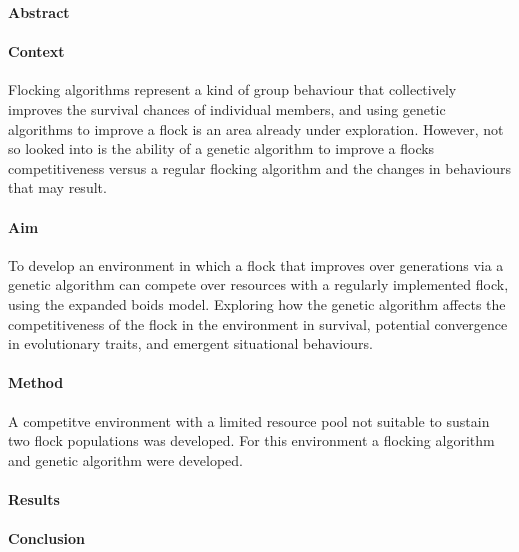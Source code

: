 
\begin{center}
\Large\textbf{Abstract}
\end{center}

\paragraph{Context}
Flocking algorithms represent a kind of group behaviour that collectively improves the survival chances of individual members, and using genetic algorithms to improve a flock is an area already under exploration. However, not so looked into is the ability of a genetic algorithm to improve a flocks competitiveness versus a regular flocking algorithm and the changes in behaviours that may result.

\paragraph{Aim}
To develop an environment in which a flock that improves over generations via a genetic algorithm can compete over resources with a regularly implemented flock, using the expanded boids model. Exploring how the genetic algorithm affects the competitiveness of the flock in the environment in survival, potential convergence in evolutionary traits, and emergent situational behaviours.

\paragraph{Method}
A competitve environment with a limited resource pool not suitable to sustain two flock populations was developed. For this environment a flocking algorithm and genetic algorithm were developed. 

\paragraph{Results}


\paragraph{Conclusion}




	
